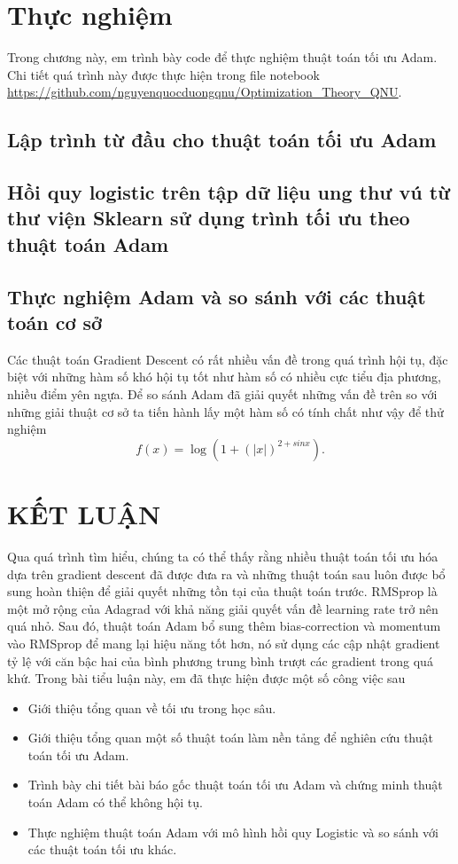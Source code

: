 \documentclass[11pt,oneside,a4paper]{report}
\theoremstyle{definition}
\begin{document}
\chapter{Thực nghiệm}

Trong chương này, em trình bày code để thực nghiệm thuật toán tối ưu Adam. Chi tiết quá trình này được thực hiện trong file notebook \url{https://github.com/nguyenquocduongqnu/Optimization_Theory_QNU}.
\section{Lập trình từ đầu cho thuật toán tối ưu Adam}
\section{Hồi quy logistic trên tập dữ liệu ung thư vú từ thư viện Sklearn sử dụng trình tối ưu theo thuật toán Adam}
\section{Thực nghiệm Adam và so sánh với các thuật toán cơ sở}
Các thuật toán Gradient Descent có rất nhiều vấn đề trong quá trình hội tụ, đặc biệt với những hàm số khó hội tụ tốt như hàm số có nhiều cực tiểu địa phương, nhiều điểm yên ngựa.
Để so sánh Adam đã giải quyết những vấn đề trên so với những giải thuật cơ sở ta tiến hành lấy một hàm số có tính chất như vậy để thử nghiệm
$$f(x)=\log \left(1+(|x|)^{2+s i n x}\right).$$
\newpage
\chapter*{KẾT LUẬN}
\fontsize{14pt}{14pt}\selectfont

Qua quá trình tìm hiểu, chúng ta có thể thấy rằng nhiều thuật toán tối ưu hóa dựa trên gradient descent đã được đưa ra và những thuật toán sau luôn được bổ sung hoàn thiện để giải quyết những tồn tại của thuật toán trước. RMSprop là một mở rộng của Adagrad với khả năng giải quyết vấn đề learning rate trở nên quá nhỏ. Sau đó, thuật toán Adam bổ sung thêm bias-correction và momentum vào RMSprop để mang lại hiệu năng tốt hơn, nó sử dụng các cập nhật gradient tỷ lệ với căn bậc hai của bình phương trung bình trượt các gradient trong quá khứ. Trong bài tiểu luận này, em đã thực hiện được một số công việc sau
\begin{itemize}
\item Giới thiệu tổng quan về tối ưu trong học sâu.
\item Giới thiệu tổng quan một số thuật toán làm nền tảng để nghiên cứu thuật toán tối ưu Adam.
\item Trình bày chi tiết bài báo gốc thuật toán tối ưu Adam và chứng minh thuật toán Adam có thể không hội tụ.
\item Thực nghiệm thuật toán Adam với mô hình hồi quy Logistic và so sánh với các thuật toán tối ưu khác.
\end{itemize}
\end{document}
